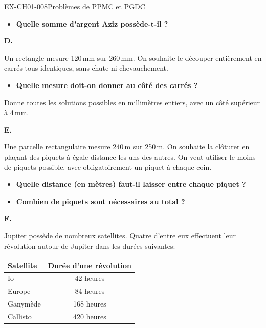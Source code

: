 \documentclass[12pt, a4paper]{article}
\begin{document}
\begin{exercice}{EX-CH01-008}{Problèmes de PPMC et PGDC}
\begin{itemize}[label=$\blacktriangleright$]
\item \textbf{Quelle somme d'argent Aziz possède-t-il ?}
\end{itemize}

\bigskip\textbf{D.}

\medskip
Un rectangle mesure 120\,mm sur 260\,mm.
On souhaite le découper entièrement en carrés tous identiques, sans chute ni chevauchement.

\begin{itemize}[label=$\blacktriangleright$]
\item \textbf{Quelle mesure doit-on donner au côté des carrés ?}
\end{itemize}

Donne toutes les solutions possibles en millimètres entiers, avec un côté supérieur à 4\,mm.

\bigskip\textbf{E.}

\medskip
Une parcelle rectangulaire mesure 240\,m sur 250\,m. On souhaite la clôturer en plaçant des piquets à égale distance les uns des autres. On veut utiliser le moins de piquets possible, avec obligatoirement un piquet à chaque coin.

\begin{itemize}[label=$\blacktriangleright$]
\item \textbf{Quelle distance (en mètres) faut-il laisser entre chaque piquet ?}
\item \textbf{Combien de piquets sont nécessaires au total ?}
\end{itemize}

\bigskip\textbf{F.}

\medskip
Jupiter possède de nombreux satellites. Quatre d'entre eux effectuent leur révolution autour de Jupiter dans les durées suivantes:

\begin{center}
\begin{tabular}{lc}
    \hline
    \textbf{Satellite} & \textbf{Durée d'une révolution} \\
    \hline
    Io         & 42 heures  \\
    Europe     & 84 heures  \\
    Ganymède   & 168 heures \\
    Callisto   & 420 heures \\
    \hline
\end{tabular}
\end{center}


\end{exercice}
\end{document}
